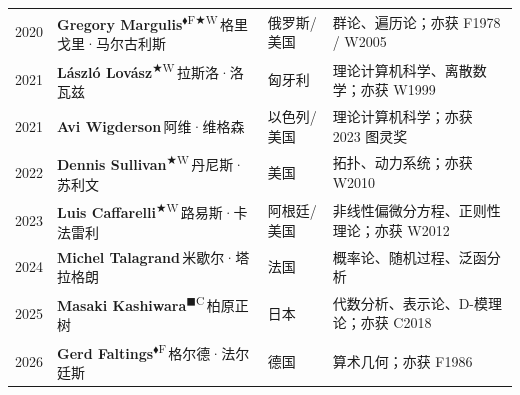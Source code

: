 \documentclass[a4paper,10pt]{article}
\newcommand{\Fbadge}{\textsuperscript{\normalfont\scriptsize\sffamily\color{fieldsclr}$\blacklozenge$F}}
\newcommand{\Wbadge}{\textsuperscript{\normalfont\scriptsize\sffamily\color{wolfclr}$\bigstar$W}}
\newcommand{\Cbadge}{\textsuperscript{\normalfont\scriptsize\sffamily\color{chernclr}$\blacksquare$C}}
\begin{document}
\begin{longtable}{
  >{\raggedright}m{1.4cm}
  >{\raggedright}m{7.0cm}
  >{\raggedright}m{4.5cm}
  >{\raggedright\arraybackslash}m{9.5cm}
}
{\color{yearcolor}2020} & {\bfseries Gregory Margulis}\Fbadge\Wbadge\,{\small\color{mutedgray}格里戈里·马尔古利斯} & 俄罗斯/美国 & {\small\color{fieldcolor}群论、遍历论；亦获 F1978 / W2005} \\[2pt]
{\color{yearcolor}2021} & {\bfseries László Lovász}\Wbadge\,{\small\color{mutedgray}拉斯洛·洛瓦兹} & 匈牙利 & {\small\color{fieldcolor}理论计算机科学、离散数学；亦获 W1999} \\[2pt]
{\color{yearcolor}2021} & {\bfseries Avi Wigderson}\,{\small\color{mutedgray}阿维·维格森} & 以色列/美国 & {\small\color{fieldcolor}理论计算机科学；亦获 2023 图灵奖} \\[2pt]
{\color{yearcolor}2022} & {\bfseries Dennis Sullivan}\Wbadge\,{\small\color{mutedgray}丹尼斯·苏利文} & 美国 & {\small\color{fieldcolor}拓扑、动力系统；亦获 W2010} \\[2pt]
{\color{yearcolor}2023} & {\bfseries Luis Caffarelli}\Wbadge\,{\small\color{mutedgray}路易斯·卡法雷利} & 阿根廷/美国 & {\small\color{fieldcolor}非线性偏微分方程、正则性理论；亦获 W2012} \\[2pt]
{\color{yearcolor}2024} & {\bfseries Michel Talagrand}\,{\small\color{mutedgray}米歇尔·塔拉格朗} & 法国 & {\small\color{fieldcolor}概率论、随机过程、泛函分析} \\[2pt]
{\color{yearcolor}2025} & {\bfseries Masaki Kashiwara}\Cbadge\,{\small\color{mutedgray}柏原正树} & 日本 & {\small\color{fieldcolor}代数分析、表示论、D-模理论；亦获 C2018} \\[2pt]
{\color{yearcolor}2026} & {\bfseries Gerd Faltings}\Fbadge\,{\small\color{mutedgray}格尔德·法尔廷斯} & 德国 & {\small\color{fieldcolor}算术几何；亦获 F1986} \\[2pt]
\end{longtable}

\vspace{0.6em}
\end{document}
